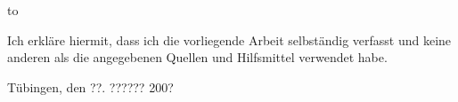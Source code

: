 \thispagestyle{empty}
\vspace*{42\baselineskip}
\hbox to \textwidth{\hrulefill}
\par
Ich erkläre hiermit, dass ich die vorliegende Arbeit selbständig verfasst und
keine anderen als die angegebenen Quellen und Hilfsmittel verwendet habe.

Tübingen, den ??. ?????? 200?

\clearpage






